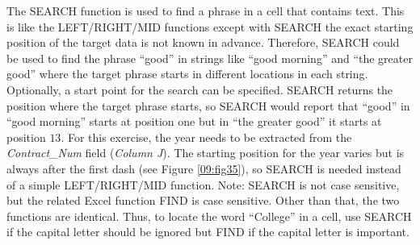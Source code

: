 The SEARCH function is used to find a phrase in a cell that contains text. This is like the LEFT/RIGHT/MID functions except with SEARCH the exact starting position of the target data is not known in advance. Therefore, SEARCH could be used to find the phrase ``good'' in strings like ``good morning'' and ``the greater good'' where the target phrase starts in different locations in each string. Optionally, a start point for the search can be specified. SEARCH returns the position where the target phrase starts, so SEARCH would report that ``good'' in ``good morning'' starts at position one but in ``the greater good'' it starts at position $ 13 $. For this exercise, the year needs to be extracted from the \textit{Contract\_Num} field (\textit{Column J}). The starting position for the year varies but is always after the first dash (see Figure \ref{09:fig35}), so SEARCH is needed instead of a simple LEFT/RIGHT/MID function. Note: SEARCH is not case sensitive, but the related Excel function FIND is case sensitive. Other than that, the two functions are identical. Thus, to locate the word ``College'' in a cell, use SEARCH if the capital letter should be ignored but FIND if the capital letter is important.

